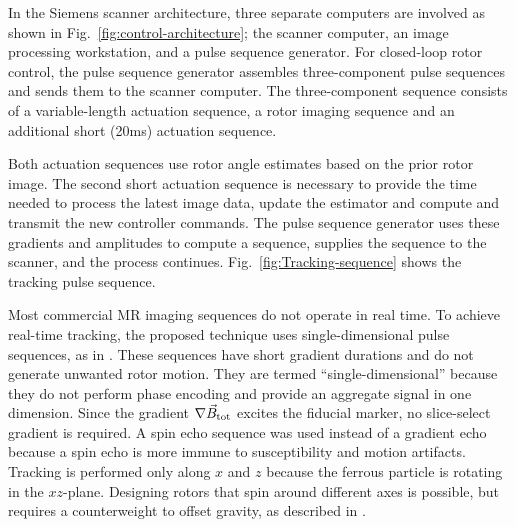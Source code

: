 \documentclass[journal]{IEEEtran}
\begin{document}
In the Siemens scanner architecture, three separate computers are involved as shown in Fig.\ \ref{fig:control-architecture}; the scanner computer, an image processing workstation, and a pulse sequence generator.  For closed-loop rotor control, the pulse sequence generator assembles three-component pulse sequences and sends them to the scanner computer.  The three-component sequence consists of a variable-length actuation sequence, a rotor imaging sequence and an additional short (20ms) actuation sequence. 

Both actuation sequences use rotor angle estimates based on the prior rotor image. The second short actuation sequence is necessary to provide the time needed to process the latest image data, update the estimator and compute and transmit the new controller commands.
The pulse sequence generator uses these gradients and amplitudes to compute a sequence, supplies the sequence to the scanner, and the process continues.  Fig.\ \ref{fig:Tracking-sequence} shows the tracking pulse sequence.

Most commercial MR imaging sequences do not operate in real time. To achieve real-time tracking, the proposed technique uses single-dimensional pulse sequences, as in \cite{cunningham2005positive, chanu2008adapting,bergeles2013closed,vartholomeos2011mripowered,vartholomeos2013mri}.  These sequences have short gradient durations and do not generate unwanted rotor motion. They are termed ``single-dimensional'' because they do not perform phase encoding and provide an aggregate signal in one dimension. Since the gradient $\nabla \vec{B}_\textnormal{tot}$  excites the fiducial marker, no slice-select gradient is required. A spin echo sequence was used instead of a gradient echo because a spin echo is more immune to susceptibility and motion artifacts. Tracking is performed only along $x$ and $z$ because the ferrous particle is rotating in the $xz$-plane.
Designing rotors that spin around different axes is possible, but requires a counterweight to offset gravity, as described in \cite{becker2014simultaneously}.
\end{document}

